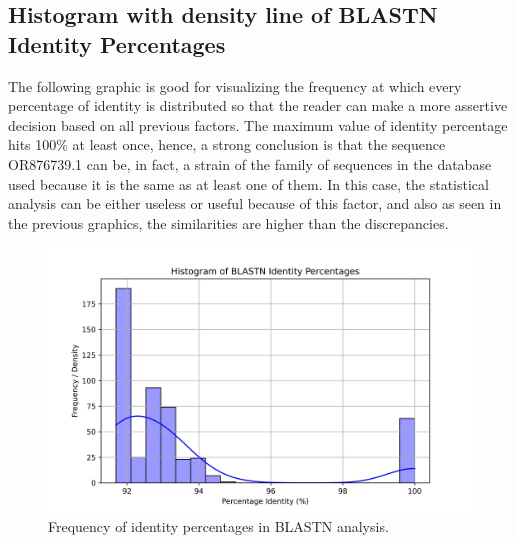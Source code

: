 \documentclass{article}%
\begin{document}
\subsection{Histogram with density line of BLASTN Identity Percentages}%
\label{subsec:HistogramwithdensitylineofBLASTNIdentityPercentages}%
The following graphic is good for visualizing the frequency at which every percentage of identity is distributed so that the reader can make a more assertive decision based on all previous factors.\newline%
\newline%
The maximum value of identity percentage hits 100\% at least once, hence, a strong conclusion is that the sequence OR876739.1 can be, in fact, a strain of the family of sequences in the database used because it is the same as at least one of them. \newline%
\newline%
In this case, the statistical analysis can be either useless or useful because of this factor, and also as seen in the previous graphics, the similarities are higher than the discrepancies. %


\begin{figure}[!htbp]%
\centering%
\includegraphics[width=1\textwidth]{hist_kde_pident.jpg}%
\caption{Frequency of identity percentages in BLASTN analysis.}%
\end{figure}

%
\end{document}
